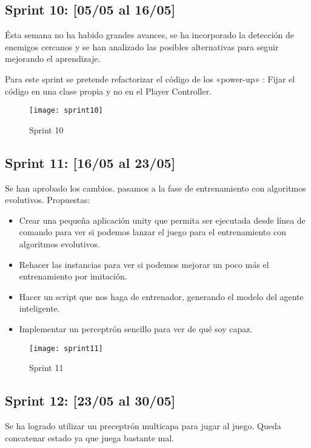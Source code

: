 \subsection{Sprint 10: [05/05 al 16/05]}

Ésta semana no ha habido grandes avances, se ha incorporado la detección de enemigos cercanos y se han analizado las posibles alternativas para seguir mejorando el aprendizaje.

Para este sprint se pretende refactorizar el código de los «power-up» : Fijar el código en una clase propia y no en el Player Controller.

\begin{figure}[h!]
    \centering
    \texttt{[image: sprint10]}
    \caption{Sprint 10}
    \label{fig:s10}
\end{figure}


\subsection{Sprint 11: [16/05 al 23/05]}

Se han aprobado los cambios. pasamos a la fase de entrenamiento con algoritmos evolutivos.
Propuestas:
\begin{itemize}
    \item Crear una pequeña aplicación unity que permita ser ejecutada desde línea de comando para ver si podemos lanzar el juego para el entrenamiento con algoritmos evolutivos.
    \item Rehacer las instancias para ver si podemos mejorar un poco más el entrenamiento por imitación.
    \item Hacer un script que nos haga de entrenador, generando el modelo del agente inteligente.
    \item Implementar un perceptrón sencillo para ver de qué soy capaz.
\end{itemize} 

\begin{figure}[h!]
    \centering
    \texttt{[image: sprint11]}
    \caption{Sprint 11}
    \label{fig:s11}
\end{figure}

\subsection{Sprint 12: [23/05 al 30/05]}

Se ha logrado utilizar un preceptrón multicapa para jugar al juego. Queda concatenar estado ya que juega bastante mal.

